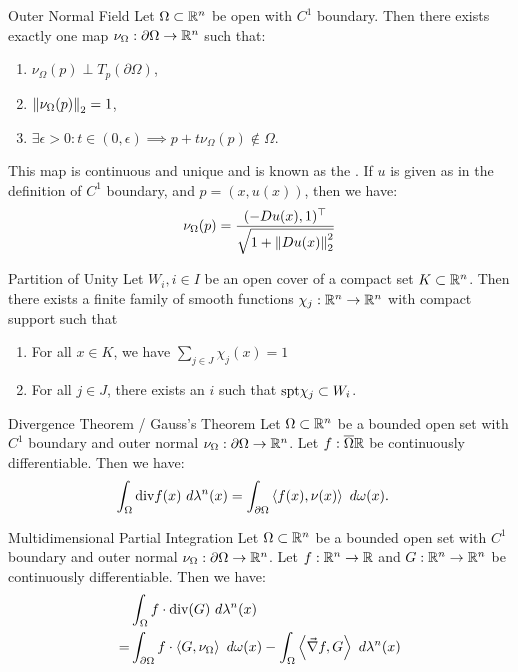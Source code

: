 \begin{importanttheorem}{Outer Normal Field}{}
	Let $\Omega \subset \mathbb{R}^n$ be open with $C^1$ boundary. Then there exists exactly one map $\nu_\Omega : \partial \Omega \to \mathbb{R}^n$ such that:
	\begin{enumerate}
		\item $\nu_\Omega(p) \perp T_p(\partial\Omega)$,
		\item $\norm{\nu_\Omega(p)}_2 = 1$,
		\item $\exists \epsilon > 0 : t \in (0,\epsilon) \implies p + t\nu_\Omega(p) \notin \Omega$.
	\end{enumerate}
	This map is continuous and unique and is known as the . If $u$ is given as in the definition of $C^1$ boundary, and $p = (x, u(x))$, then we have:
	\begin{align*}
		\nu_\Omega(p) = \frac{(-Du(x),1)^\top}{\sqrt{1 + \norm{Du(x)}_2^2}}
	\end{align*}
\end{importanttheorem}
\begin{importantlemma}{Partition of Unity}{}
	Let $W_i, i \in I$ be an open cover of a compact set $K \subset \mathbb{R}^n$. Then there exists a finite family of smooth functions $\chi_j : \mathbb{R}^n \to \mathbb{R}^n$ with compact support such that
	\begin{enumerate}
		\item For all $x \in K$, we have $\sum_{j \in J} \chi_j(x) = 1$
		\item For all $j \in J$, there exists an $i$ such that $\textnormal{spt} \chi_j \subset W_i$.
	\end{enumerate}
\end{importantlemma}
\begin{importanttheorem}{Divergence Theorem / Gauss's Theorem}{}
	Let $\Omega \subset \mathbb{R}^n$ be a bounded open set with $C^1$ boundary and outer normal $\nu_\Omega : \partial \Omega \to \mathbb{R}^n$. Let $f : \overline{{\Omega}} \mathbb{R}$ be continuously differentiable. Then we have:
	\begin{align*}
		\int_\Omega \textnormal{div} f(x) ~d\lambda^n(x)
		&=
		\int_{\partial \Omega} \left\langle f(x), \nu(x) \right\rangle ~d\omega(x).
	\end{align*}
\end{importanttheorem}
\begin{importanttheorem}{Multidimensional Partial Integration}{}
	Let $\Omega \subset \mathbb{R}^n$ be a bounded open set with $C^1$ boundary and outer normal $\nu_\Omega : \partial \Omega \to \mathbb{R}^n$. Let $f : \mathbb{R}^n \to \mathbb{R}$ and $G : \mathbb{R}^n \to \mathbb{R}^n$ be continuously differentiable. Then we have:
	\begin{align*}
		&\int_{\Omega} f \cdot \textnormal{div}(G) ~d\lambda^n(x)\\
		=
		&\int_{\partial \Omega} f \cdot \left\langle G, \nu_\Omega \right\rangle ~d\omega(x)
		-
		\int_\Omega \left\langle \vec{\nabla} f, G \right\rangle ~d\lambda^n(x)
	\end{align*}
\end{importanttheorem}
